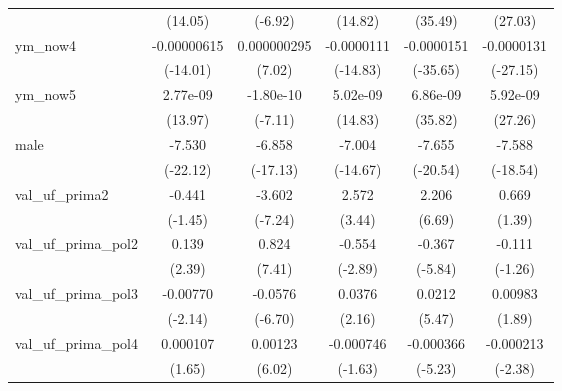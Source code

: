 {\begin{tabular}{l*{5}{c}}
                    &     (14.05)         &     (-6.92)         &     (14.82)         &     (35.49)         &     (27.03)         \\
ym\_now4             & -0.00000615\sym{***}& 0.000000295\sym{***}&  -0.0000111\sym{***}&  -0.0000151\sym{***}&  -0.0000131\sym{***}\\
                    &    (-14.01)         &      (7.02)         &    (-14.83)         &    (-35.65)         &    (-27.15)         \\
ym\_now5             &    2.77e-09\sym{***}&   -1.80e-10\sym{***}&    5.02e-09\sym{***}&    6.86e-09\sym{***}&    5.92e-09\sym{***}\\
                    &     (13.97)         &     (-7.11)         &     (14.83)         &     (35.82)         &     (27.26)         \\
male                &      -7.530\sym{***}&      -6.858\sym{***}&      -7.004\sym{***}&      -7.655\sym{***}&      -7.588\sym{***}\\
                    &    (-22.12)         &    (-17.13)         &    (-14.67)         &    (-20.54)         &    (-18.54)         \\
val\_uf\_prima2       &      -0.441         &      -3.602\sym{***}&       2.572\sym{***}&       2.206\sym{***}&       0.669         \\
                    &     (-1.45)         &     (-7.24)         &      (3.44)         &      (6.69)         &      (1.39)         \\
val\_uf\_prima\_pol2   &       0.139\sym{*}  &       0.824\sym{***}&      -0.554\sym{**} &      -0.367\sym{***}&      -0.111         \\
                    &      (2.39)         &      (7.41)         &     (-2.89)         &     (-5.84)         &     (-1.26)         \\
val\_uf\_prima\_pol3   &    -0.00770\sym{*}  &     -0.0576\sym{***}&      0.0376\sym{*}  &      0.0212\sym{***}&     0.00983         \\
                    &     (-2.14)         &     (-6.70)         &      (2.16)         &      (5.47)         &      (1.89)         \\
val\_uf\_prima\_pol4   &    0.000107         &     0.00123\sym{***}&   -0.000746         &   -0.000366\sym{***}&   -0.000213\sym{*}  \\
                    &      (1.65)         &      (6.02)         &     (-1.63)         &     (-5.23)         &     (-2.38)         \\

\end{tabular}}
